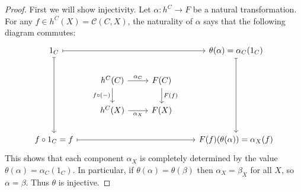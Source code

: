 \documentclass[12pt]{article}
\begin{document}
\begin{proof}
	First we will show injectivity. Let $\alpha:h^C\to F$ be a natural transformation. For any $f\in h^C(X)=\mathcal{C}(C,X)$, the naturality of $\alpha$ says that the following diagram commutes:
	\begin{equation*}
\begin{tikzcd}
1_C \arrow[rrr, maps to] \arrow[ddd, maps to] &                                                      &                        & \theta(\alpha)=\alpha_C(1_C) \arrow[ddd, maps to] \\
                                              & h^C(C) \arrow[d, "f\circ(-)"'] \arrow[r, "\alpha_C"] & F(C) \arrow[d, "F(f)"] &                                                   \\
                                              & h^C(X) \arrow[r, "\alpha_X"']                        & F(X)                   &                                                   \\
f\circ 1_C=f \arrow[rrr, maps to]             &                                                      &                        & F(f)(\theta(\alpha))=\alpha_X(f)                 
\end{tikzcd}
	\end{equation*}
	This shows that each component $\alpha_X$ is completely determined by the value $\theta(\alpha)=\alpha_C(1_C)$. In particular, if $\theta(\alpha)=\theta(\beta)$ then $\alpha_X=\beta_X$ for all $X$, so $\alpha=\beta$. Thus $\theta$ is injective.


\end{proof}
\end{document}
